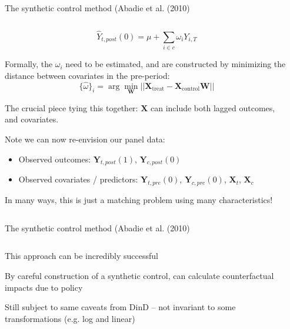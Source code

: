 \documentclass[notes,11pt, aspectratio=169]{beamer}
\newenvironment{wideitemize}{\itemize\addtolength{\itemsep}{10pt}}{\enditemize}
\begin{document}
\begin{frame}{The synthetic control method (Abadie et al. (2010)}
  \begin{columns}[T] %
    \begin{column}{0.9\textwidth}
  \begin{equation*}
    \hat{Y}_{t,post}(0) = \mu + \sum_{i \in c}\omega_{i} Y_{i, T}
  \end{equation*}
  \begin{wideitemize}
  \item Formally, the $\omega_{i}$ need to be estimated, and are
    constructed by minimizing the distance between covariates in the pre-period:
    \begin{equation*}
      \{\hat{\omega} \}_{i} = \arg\min_{\boldsymbol{W}}||\boldsymbol{X}_{\text{treat}} - \boldsymbol{X}_{\text{control}}\boldsymbol{W}||
    \end{equation*}
  \item The crucial piece tying this together: $\boldsymbol{X}$ can
    include both lagged outcomes, and covariates.
  \item Note we can now re-envision our panel data:
    \begin{itemize}
    \item Observed outcomes:     $\mathbf{Y}_{t,post}(1)$, $\mathbf{Y}_{c,post}(0)$
    \item Observed covariates / predictors: $\mathbf{Y}_{t,pre}(0)$, $\mathbf{Y}_{c,pre}(0)$, $\mathbf{X}_{t}$, $\mathbf{X}_{c}$
    \end{itemize}
  \item In many ways, this is just a matching problem using many characteristics!
  \end{wideitemize}
\end{column}
\begin{column}{0.4\textwidth}
\end{column}
\end{columns}
\end{frame}

\begin{frame}{The synthetic control method (Abadie et al. (2010)}
  \begin{columns}[T] %
    \begin{column}{0.5\textwidth}
  \begin{wideitemize}
  \item<1-> This approach can be incredibly successful
  \item<2-> By careful construction of a synthetic control, can
    calculate counterfactual impacts due to policy
  \item<2-> Still subject to same caveats from DinD -- not invariant
    to some transformations (e.g. log and linear)
  \end{wideitemize}
\end{column}
\begin{column}{0.5\textwidth}
\end{column}
\end{columns}
\end{frame}
\end{document}
